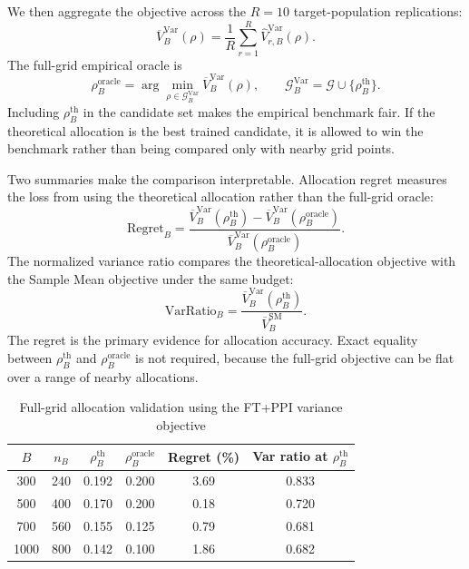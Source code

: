 \documentclass[11pt]{article}
\begin{document}
We then aggregate the objective across the $R=10$ target-population replications:
\[
    \overline V_B^{\mathrm{Var}}(\rho)
    =
    \frac{1}{R}\sum_{r=1}^R
    \widehat V_{r,B}^{\mathrm{Var}}(\rho).
\]
The full-grid empirical oracle is
\[
    \rho_B^{\mathrm{oracle}}
    =
    \arg\min_{\rho\in\mathcal{G}_B^{\mathrm{Var}}}
    \overline V_B^{\mathrm{Var}}(\rho),
    \qquad
    \mathcal{G}_B^{\mathrm{Var}}=\mathcal{G}\cup\{\rho_B^{\mathrm{th}}\}.
\]
Including $\rho_B^{\mathrm{th}}$ in the candidate set makes the empirical benchmark fair. If the
theoretical allocation is the best trained candidate, it is allowed to win the benchmark rather
than being compared only with nearby grid points.

Two summaries make the comparison interpretable. Allocation regret measures the loss from using
the theoretical allocation rather than the full-grid oracle:
\[
    \mathrm{Regret}_B
    =
    \frac{
        \overline V_B^{\mathrm{Var}}(\rho_B^{\mathrm{th}})
        -
        \overline V_B^{\mathrm{Var}}(\rho_B^{\mathrm{oracle}})
    }{
        \overline V_B^{\mathrm{Var}}(\rho_B^{\mathrm{oracle}})
    } . 
\]
The normalized variance ratio compares the theoretical-allocation objective with the Sample Mean
objective under the same budget:
\[
    \mathrm{VarRatio}_B
    =
    \frac{
        \overline V_B^{\mathrm{Var}}(\rho_B^{\mathrm{th}})
    }{
        \overline V_B^{\mathrm{SM}}
    } .
\]
The regret is the primary evidence for allocation accuracy. Exact equality between
$\rho_B^{\mathrm{th}}$ and $\rho_B^{\mathrm{oracle}}$ is not required, because the full-grid
objective can be flat over a range of nearby allocations.

\begin{table}[H]
\centering
\caption{Full-grid allocation validation using the FT+PPI variance objective}
\label{tab:full_grid_allocation}
\small
\setlength{\tabcolsep}{7pt}
\renewcommand{\arraystretch}{1.12}
\begin{tabular}{@{}c c c c c c@{}}
\toprule
$B$ & $n_B$ & $\rho_B^{\mathrm{th}}$ & $\rho_B^{\mathrm{oracle}}$ & Regret (\%) & Var ratio at $\rho_B^{\mathrm{th}}$ \\
\midrule
300  & 240 & 0.192 & 0.200 & 3.69 & 0.833 \\
500  & 400 & 0.170 & 0.200 & 0.18 & 0.720 \\
700  & 560 & 0.155 & 0.125 & 0.79 & 0.681 \\
1000 & 800 & 0.142 & 0.100 & 1.86 & 0.682 \\
\bottomrule
\end{tabular}
\end{table}
\end{document}

